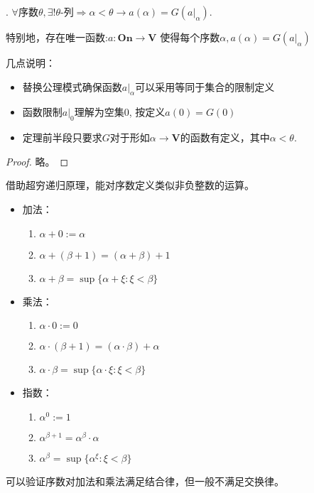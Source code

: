 \begin{Them}[超穷递归原理].
    $\forall \text{序数}\theta, \exists !\theta \text{-列} \Rightarrow \alpha <\theta \rightarrow a(\alpha)=G(a|_{\alpha})$.
    
    特别地，存在唯一函数:$a:\mathbf{On}\rightarrow \mathbf{V}$ 使得每个序数$\alpha, a(\alpha)=G(a|_{\alpha})$

    几点说明：
    \begin{itemize}
        \item 替换公理模式确保函数$a|_{\alpha }$可以采用等同于集合的限制定义
        \item 函数限制$a|_0$理解为空集0, 按定义$a(0)=G(0)$
        \item 定理前半段只要求$G$对于形如$\alpha \rightarrow \mathbf{V}$的函数有定义，其中$\alpha < \theta$.
    \end{itemize}
    \begin{proof}
        略。
    \end{proof}
\end{Them}
借助超穷递归原理，能对序数定义类似非负整数的运算。
\begin{itemize}
    \item 加法：
    \begin{enumerate}
        \item $\alpha +0:=\alpha $
        \item $\alpha + (\beta +1)=(\alpha +\beta )+1$
        \item $\alpha +\beta =\sup\{\alpha +\xi:\xi < \beta\}$
    \end{enumerate}
    \item 乘法：
    \begin{enumerate}
        \item $\alpha \cdot 0:=0$
        \item $\alpha \cdot (\beta + 1)=(\alpha \cdot \beta) + \alpha $
        \item $\alpha \cdot \beta =\sup \{\alpha \cdot \xi : \xi < \beta \}$
    \end{enumerate}
    \item 指数：
    \begin{enumerate}
        \item $\alpha^0 :=1$
        \item $\alpha^{\beta +1}=\alpha^{\beta }\cdot \alpha $
        \item $\alpha^{\beta}=\sup\{\alpha^{\xi}: \xi < \beta \}$
    \end{enumerate}
\end{itemize}
    可以验证序数对加法和乘法满足结合律，但一般不满足交换律。

